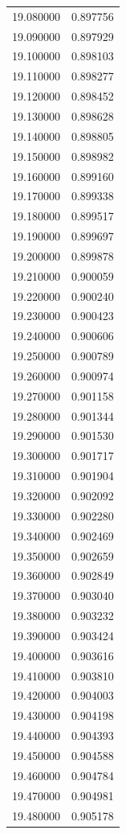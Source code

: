 \begin{tabular}{rr}
19.080000 & 0.897756 \\
19.090000 & 0.897929 \\
19.100000 & 0.898103 \\
19.110000 & 0.898277 \\
19.120000 & 0.898452 \\
19.130000 & 0.898628 \\
19.140000 & 0.898805 \\
19.150000 & 0.898982 \\
19.160000 & 0.899160 \\
19.170000 & 0.899338 \\
19.180000 & 0.899517 \\
19.190000 & 0.899697 \\
19.200000 & 0.899878 \\
19.210000 & 0.900059 \\
19.220000 & 0.900240 \\
19.230000 & 0.900423 \\
19.240000 & 0.900606 \\
19.250000 & 0.900789 \\
19.260000 & 0.900974 \\
19.270000 & 0.901158 \\
19.280000 & 0.901344 \\
19.290000 & 0.901530 \\
19.300000 & 0.901717 \\
19.310000 & 0.901904 \\
19.320000 & 0.902092 \\
19.330000 & 0.902280 \\
19.340000 & 0.902469 \\
19.350000 & 0.902659 \\
19.360000 & 0.902849 \\
19.370000 & 0.903040 \\
19.380000 & 0.903232 \\
19.390000 & 0.903424 \\
19.400000 & 0.903616 \\
19.410000 & 0.903810 \\
19.420000 & 0.904003 \\
19.430000 & 0.904198 \\
19.440000 & 0.904393 \\
19.450000 & 0.904588 \\
19.460000 & 0.904784 \\
19.470000 & 0.904981 \\
19.480000 & 0.905178 \\

\end{tabular}
